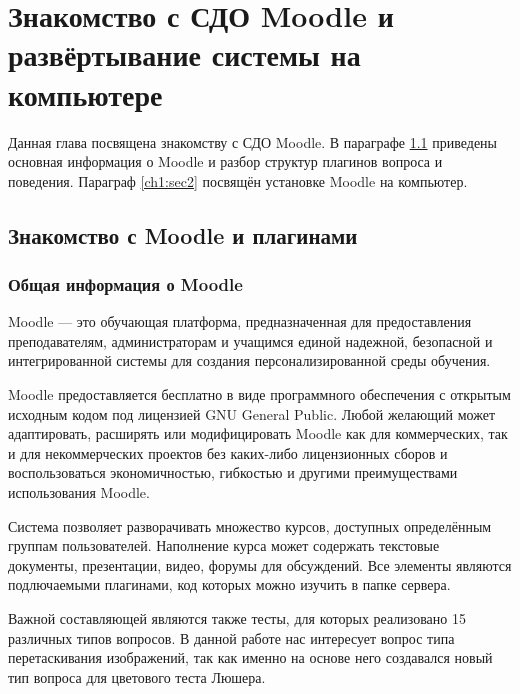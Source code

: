 \chapter{Знакомство с СДО Moodle и развёртывание системы на компьютере} \label{ch1}


Данная глава посвящена знакомству с СДО Moodle. В параграфе \ref{ch1:sec1} приведены основная информация о Moodle и разбор структур плагинов вопроса и поведения. Параграф \ref{ch1:sec2} посвящён установке Moodle на компьютер.
 


\section{Знакомство с Moodle и плагинами} \label{ch1:sec1}

\subsection{Общая информация о Moodle} %
Moodle — это обучающая платформа, предназначенная для предоставления преподавателям, администраторам и учащимся единой надежной, безопасной и интегрированной системы для создания персонализированной среды обучения.\cite{about-moodle}

Moodle предоставляется бесплатно в виде программного обеспечения с открытым исходным кодом под лицензией GNU General Public. Любой желающий может адаптировать, расширять или модифицировать Moodle как для коммерческих, так и для некоммерческих проектов без каких-либо лицензионных сборов и воспользоваться экономичностью, гибкостью и другими преимуществами использования Moodle.\cite{about-moodle}

Система позволяет разворачивать множество курсов, доступных определённым группам пользователей. Наполнение курса может содержать текстовые документы, презентации, видео, форумы для обсуждений. Все элементы являются подлючаемыми плагинами, код которых можно изучить в папке сервера.

Важной составляющей являются также тесты, для которых реализовано 15 различных типов вопросов. В данной работе нас интересует вопрос типа перетаскивания изображений, так как именно на основе него создавался новый тип вопроса для цветового теста Люшера.

